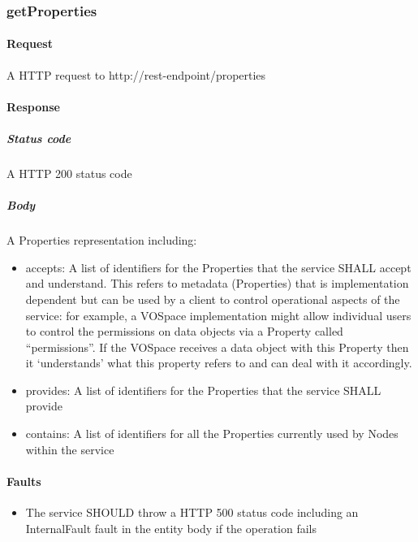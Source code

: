 \documentclass[11pt,a4paper]{ivoa}
\begin{document}
\subsubsection{getProperties}
\label{subsubsec:getproperties}

\paragraph{Request}
A HTTP request to http://rest-endpoint/properties

\paragraph{Response}
\subparagraph{Status code} A HTTP 200 status code
\subparagraph{Body}
A Properties representation including:
\begin{itemize}
    \item accepts: A list of identifiers for the Properties that the service SHALL accept and understand. This refers to metadata (Properties) that is implementation dependent but can be used by a client to control operational aspects of the service: for example, a VOSpace implementation might allow individual users to control the permissions on data objects via a Property called ``permissions''. If the VOSpace receives a data object with this Property then it `understands' what this property refers to and can deal with it accordingly.
    \item provides: A list of identifiers for the Properties that the service SHALL provide
    \item contains: A list of identifiers for all the Properties currently used by Nodes within the service
\end{itemize}

\paragraph{Faults}
\begin{itemize}
    \item The service SHOULD throw a HTTP 500 status code including an InternalFault fault in the entity body if the operation fails
\end{itemize}
\end{document}
